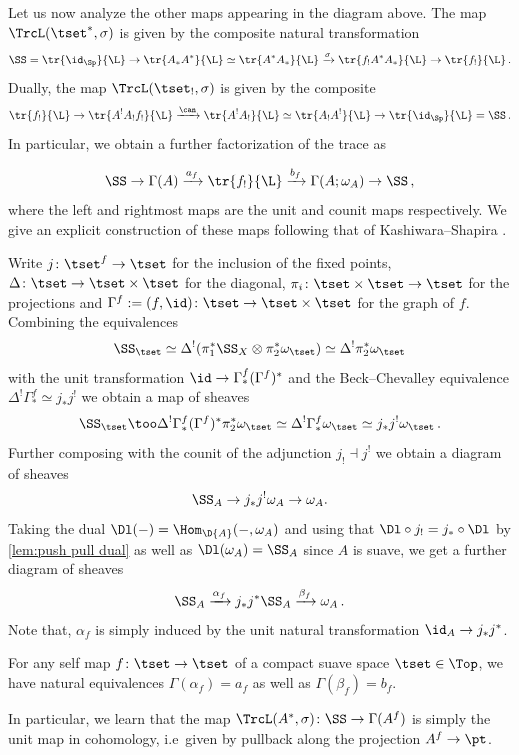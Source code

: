Let us now analyze the other maps appearing in the diagram above.
The map $\TrcL(\tset^{\ast},\sigma)$ is given by the composite natural transformation
\[ \SS = \tr{\id_{\Sp}}{\L}\to \tr{A_{\ast}A^{\ast}}{\L}
  \simeq \tr{A^{\ast}A_{\ast}}{\L} \xrightarrow{\sigma} \tr{f_! A^{\ast}A_{\ast}}{\L}
  \to \tr{f_!}{\L}\,.\]
Dually, the map $\TrcL(\tset_!,\sigma)$ is given by the composite
\[ \tr{f_!}{\L}\to \tr{A^{!}A_! f_!}{\L}
  \xrightarrow{\can} \tr{A^{!}A_{!}}{\L} \simeq \tr{A_!A^{!}}{\L} \to \tr{\id_{\Sp}}{\L} =\SS\,.\]
In particular, we obtain a further factorization of the trace as

\[ \SS \to \Gamma(A) \xrightarrow{a_f} \tr{f_!}{\L} \xrightarrow{b_f} \Gamma(A;\omega_A) \to \SS\,,\]
where the left and rightmost maps are the unit and counit maps respectively.
We give an explicit construction of these maps following that of 
Kashiwara--Shapira \cite{kssheaves}.

\begin{cons}
  Write $j\colon \tset^{f}\to \tset$ for the inclusion of the fixed points, $\Delta\colon \tset \to \tset \times \tset$
  for the diagonal, $\pi_i\colon \tset \times \tset \to \tset$ for the projections and
  $\Gamma^{f}:=(f,\id)\colon \tset \to \tset\times \tset$ for the graph of $f$.
  Combining the equivalences
  \[\SS_{\tset}\simeq \Delta^{!}(\pi_{1}^{\ast}\SS_{X}\otimes \pi_{2}^{\ast}\omega_{\tset})
    \simeq \Delta^{!}\pi_{2}^{\ast}\omega_{\tset}\]
  with the unit transformation $\id \to \Gamma_{\ast}^{f}(\Gamma^{f})^{\ast}$ and the Beck--Chevalley
  equivalence $\Delta^{!}\Gamma^{f}_{\ast}\simeq j_{\ast}j^!$ we obtain a map of sheaves
  \[ \SS_{\tset} \too \Delta^{!}\Gamma^{f}_{\ast}(\Gamma^{f})^{\ast} \pi_2^{\ast}\omega_{\tset}
    \simeq \Delta^{!}\Gamma^{f}_{\ast}\omega_{\tset} \simeq j_{\ast}j^{!}\omega_{\tset}\,.\]
  Further composing with the counit of the adjunction $j_!\dashv j^!$ we obtain a diagram
  of sheaves
  \[ \SS_A\to j_{\ast}j^{!}\omega_A \to \omega_A.\]
  Taking the dual $\Dl(-)=\Hom_{\D{A}}(-,\omega_A)$ and using that $\Dl\circ j_! = j_{\ast}\circ \Dl$
  by \cref{lem:push pull dual} as well as $\Dl(\omega_A)=\SS_A$ since $A$ is suave, we get a further diagram
  of sheaves
  \[ \SS_A \xrightarrow{\alpha_f} j_{\ast}j^{\ast} \SS_{A} \xrightarrow{\beta_f} \omega_A\,.\]
  Note that, $\alpha_f$ is simply induced by the unit natural transformation
  $\id_A\to j_{\ast}j^{\ast}$.
\end{cons}

\begin{lem}\label{lem: maps in triangle}
  For any self map $f\colon \tset \to \tset$ of a compact suave space $\tset \in \Top$,
  we have natural equivalences $\Gamma(\alpha_f)=a_f$ as well as $\Gamma(\beta_f)=b_f$.
\end{lem}
In particular, we learn that the map $\TrcL(A^{\ast},\sigma) \colon \SS\to \Gamma(A^f)$
is simply the unit map in cohomology, i.e~given by pullback along the projection $A^f\to \pt$.



